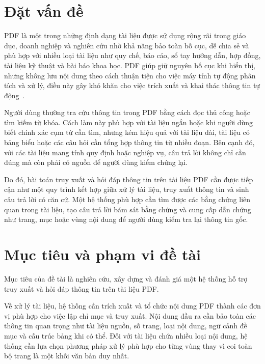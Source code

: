 \documentclass[../DoAn.tex]{subfiles}
\begin{document}
\section{Đặt vấn đề}

\label{section:1.1}

PDF là một trong những định dạng tài liệu được sử dụng rộng rãi trong giáo dục, doanh nghiệp và nghiên cứu nhờ khả năng bảo toàn bố cục, dễ chia sẻ và phù hợp với nhiều loại tài liệu như quy chế, báo cáo, sổ tay hướng dẫn, hợp đồng, tài liệu kỹ thuật và bài báo khoa học. PDF giúp giữ nguyên bố cục khi hiển thị, nhưng không lưu nội dung theo cách thuận tiện cho việc máy tính tự động phân tích và xử lý, điều này gây khó khăn cho việc trích xuất và khai thác thông tin tự động~\cite{pfitzmann2022doclaynet,smock2022pubtables}.



Người dùng thường tra cứu thông tin trong PDF bằng cách đọc thủ công hoặc tìm kiếm từ khóa. Cách làm này phù hợp với tài liệu ngắn hoặc khi người dùng biết chính xác cụm từ cần tìm, nhưng kém hiệu quả với tài liệu dài, tài liệu có bảng biểu hoặc các câu hỏi cần tổng hợp thông tin từ nhiều đoạn. Bên cạnh đó, với các tài liệu mang tính quy định hoặc nghiệp vụ, câu trả lời không chỉ cần đúng mà còn phải có nguồn để người dùng kiểm chứng lại.



Do đó, bài toán truy xuất và hỏi đáp thông tin trên tài liệu PDF cần được tiếp cận như một quy trình kết hợp giữa xử lý tài liệu, truy xuất thông tin và sinh câu trả lời có căn cứ. Một hệ thống phù hợp cần tìm được các bằng chứng liên quan trong tài liệu, tạo câu trả lời bám sát bằng chứng và cung cấp dẫn chứng như trang, mục hoặc vùng nội dung để người dùng kiểm tra lại thông tin gốc.



\section{Mục tiêu và phạm vi đề tài}

\label{section:objectives-and-scope}



Mục tiêu của đề tài là nghiên cứu, xây dựng và đánh giá một hệ thống hỗ trợ truy xuất và hỏi đáp thông tin trên tài liệu PDF.

Về xử lý tài liệu, hệ thống cần trích xuất và tổ chức nội dung PDF thành các đơn vị phù hợp cho việc lập chỉ mục và truy xuất. Nội dung đầu ra cần bảo toàn các thông tin quan trọng như tài liệu nguồn, số trang, loại nội dung, ngữ cảnh đề mục và cấu trúc bảng khi có thể. Đối với tài liệu chứa nhiều loại nội dung, hệ thống
cần lựa chọn phương pháp xử lý phù hợp cho từng vùng thay vì coi toàn bộ trang là một khối văn bản duy nhất.
\end{document}
